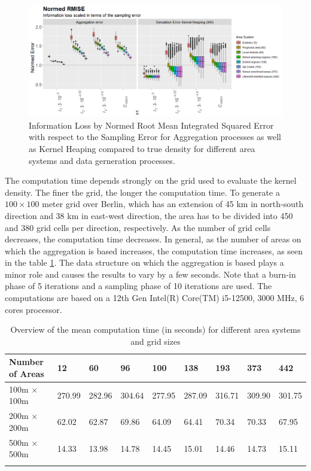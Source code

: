 \begin{figure}[ht]
    \centering
    \includegraphics[width = \textwidth]{Figure/NormedRMISE.png}
    \caption{Information Loss by Normed Root Mean Integrated Squared Error with respect to the Sampling Error for Aggregation processes as well as Kernel Heaping compared to true density for different area systems and data gerneration processes.}
    \label{fig:NormedRMISE}
\end{figure}

The computation time depends strongly on the grid used to evaluate the kernel density. 
The finer the grid, the longer the computation time.
To generate a $100 \times 100$ meter grid over Berlin, which has an extension of 45 km in north-south direction and 38 km in east-west direction, the area has to be divided into 450 and 380 grid cells per direction, respectively.  
As the number of grid cells decreases, the computation time decreases. 
In general, as the number of areas on which the aggregation is based increases, the computation time increases, as seen in the table \ref{tab:my_label2}. 
The data structure on which the aggregation is based plays a minor role and causes the results to vary by a few seconds. Note that a burn-in phase of 5 iterations and a sampling phase of 10 iterations are used. The computations are based on a 12th Gen Intel(R) Core(TM) i5-12500, 3000 MHz, 6 cores processor. 

\begin{longtable}{|l || l| l |l | l| l | l | l| l | }
    \hline
    Number of Areas & 12 & 60 & 96 & 100& 138 & 193 & 373 & 442 \\
    \hline 
    100m $\times$ 100m &  270.99 & 282.96 & 304.64 & 277.95 & 287.09& 316.71 & 309.90 & 301.75 \\ 
    200m $\times$ 200m &  62.02 &  62.87 &  69.86 &  64.09&  64.41&  70.34&  70.33&  67.95 \\
    500m $\times$ 500m & 14.33&   13.98& 14.78& 14.45& 15.01&  14.46&
   14.73& 15.11  \\
    \hline
    \caption{Overview of the mean computation time (in seconds) for different area systems and grid sizes}\label{tab:my_label2}
\end{longtable}

